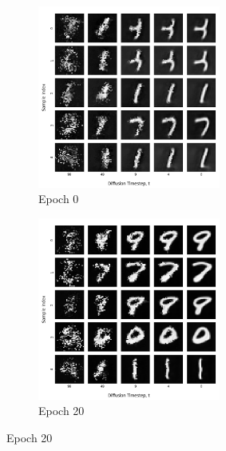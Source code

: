 \documentclass[12pt]{article}
\begin{document}
\begin{figure}[hp]
    \begin{subfigure}{0.49\textwidth}
    \includegraphics[width=0.9\linewidth, height=6cm, center]{figures/diffusion_plot_9_0000}
    \caption{Epoch 0}
    \label{fig:9_0}
    \end{subfigure}
    \begin{subfigure}{0.49\textwidth}
    \includegraphics[width=0.9\linewidth, height=6cm, center]{figures/diffusion_plot_9_0020.png}
    \caption{Epoch 20}
    \label{fig:9_20}
    \end{subfigure}


\end{figure}
\end{document}
